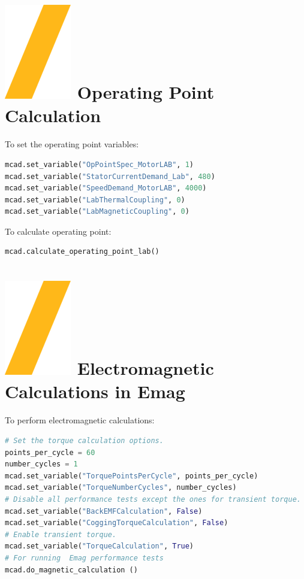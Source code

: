 \documentclass[landscape]{article}
\begin{document}
\begin{multicols}{3}
\section{\includegraphics[height=\fontcharht\font`\S]{slash.png} Operating Point Calculation}
 To set the operating point variables:
\begin{lstlisting}[language=Python]
mcad.set_variable("OpPointSpec_MotorLAB", 1)
mcad.set_variable("StatorCurrentDemand_Lab", 480)
mcad.set_variable("SpeedDemand_MotorLAB", 4000)
mcad.set_variable("LabThermalCoupling", 0)
mcad.set_variable("LabMagneticCoupling", 0)
\end{lstlisting}
To calculate operating point:
\begin{lstlisting}[language=Python]
mcad.calculate_operating_point_lab()
\end{lstlisting}
\section{\includegraphics[height=\fontcharht\font`\S]{slash.png} Electromagnetic Calculations in Emag}
To perform electromagnetic calculations:
\begin{lstlisting}[language=Python]
# Set the torque calculation options.
points_per_cycle = 60 
number_cycles = 1
mcad.set_variable("TorquePointsPerCycle", points_per_cycle)
mcad.set_variable("TorqueNumberCycles", number_cycles)
# Disable all performance tests except the ones for transient torque.
mcad.set_variable("BackEMFCalculation", False)
mcad.set_variable("CoggingTorqueCalculation", False)
# Enable transient torque.
mcad.set_variable("TorqueCalculation", True)
# For running  Emag performance tests
mcad.do_magnetic_calculation ()
\end{lstlisting}



\end{multicols}
\end{document}
